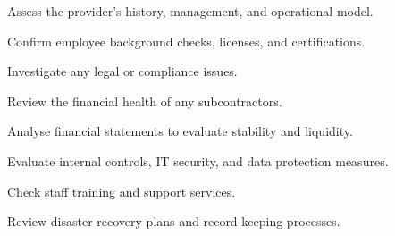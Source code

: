 

\begin{checks}
\item Assess the provider's history, management, and operational model.
\item Confirm employee background checks, licenses, and certifications.
\item Investigate any legal or compliance issues.
\end{checks}

\begin{checks}
\item Review the financial health of any subcontractors.
\item Analyse financial statements to evaluate stability and liquidity.
\end{checks}

\begin{checks}
\item Evaluate internal controls, IT security, and data protection measures.
\item Check staff training and support services.
\item Review disaster recovery plans and record-keeping processes.
\end{checks}




